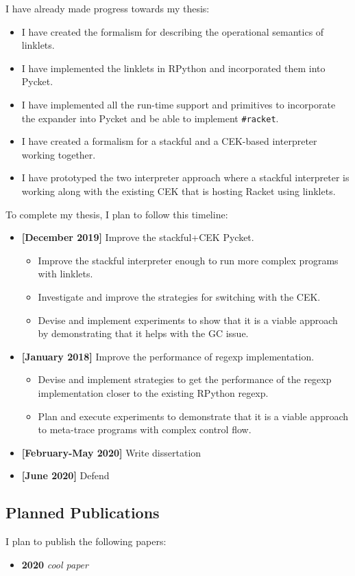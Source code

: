 I have already made progress towards my thesis:

\begin{itemize}
\item I have created the formalism for describing the operational
  semantics of linklets.
\item I have implemented the linklets in RPython and incorporated them into
  Pycket.
\item I have implemented all the run-time support and primitives to
  incorporate the expander into Pycket and be able to implement
  \texttt{\#racket}.
\item I have created a formalism for a stackful and a CEK-based
  interpreter working together.
\item I have prototyped the two interpreter approach where a stackful
  interpreter is working along with the existing CEK that is hosting
  Racket using linklets.
\end{itemize}

To complete my thesis, I plan to follow this timeline:

\begin{itemize}
  \item \textbf{[December 2019]} Improve the stackful+CEK Pycket.
    \begin{itemize}
    \item Improve the stackful interpreter enough to run more complex
      programs with linklets.
     \item Investigate and improve the strategies for switching with
       the CEK.
     \item Devise and implement experiments to show that it is a
       viable approach by demonstrating that it helps with the GC
       issue.
    \end{itemize}
  \item \textbf{[January 2018]} Improve the performance of regexp
    implementation.
    \begin{itemize}
      \item Devise and implement strategies to get the performance of
        the regexp implementation closer to the existing RPython
        regexp.
      \item Plan and execute experiments to demonstrate that it is a
        viable approach to meta-trace programs with complex control
        flow.
    \end{itemize}
  \item \textbf{[February-May 2020]} Write dissertation
  \item \textbf{[June 2020]} Defend
\end{itemize}

\subsection{Planned Publications}

I plan to publish the following papers:

\begin{itemize}
  \item \textbf{2020} \emph{cool paper}
\end{itemize}
